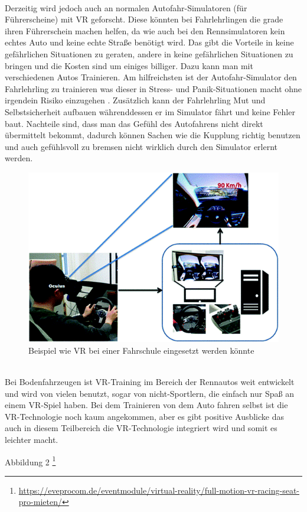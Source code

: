 \\
Derzeitig wird jedoch auch an normalen Autofahr-Simulatoren (für Führerscheine) mit VR geforscht. Diese könnten bei Fahrlehrlingen die grade ihren Führerschein machen helfen, da wie auch bei den Rennsimulatoren kein echtes Auto und keine echte Straße benötigt wird. Das gibt die Vorteile in keine gefährlichen Situationen zu geraten, andere in keine gefährlichen Situationen zu bringen und die Kosten sind um einiges billiger. Dazu kann man mit verschiedenen Autos Trainieren. Am hilfreichsten ist der Autofahr-Simulator den Fahrlehrling zu trainieren was dieser in Stress- und Panik-Situationen macht ohne irgendein Risiko einzugehen \cite{ihemedu2017virtual}. Zusätzlich kann der Fahrlehrling Mut und Selbstsicherheit aufbauen währenddessen er im Simulator fährt und keine Fehler baut. Nachteile sind, dass man das Gefühl des Autofahrens nicht direkt übermittelt bekommt, dadurch können Sachen wie die Kupplung richtig benutzen und auch gefühlsvoll zu bremsen nicht wirklich durch den Simulator erlernt werden.
\\
\begin{figure}[!ht]
    \centering
    \includegraphics[width=1.0\textwidth]{images/Abbildung 3.png}
    \caption{\label{fig:Abbildung 3}Beispiel wie VR bei einer Fahrschule eingesetzt werden könnte\cite{ihemedu2017virtual}\protect
    }
\end{figure}
\\
Bei Bodenfahrzeugen ist VR-Training im Bereich der Rennautos weit entwickelt und wird von vielen benutzt, sogar von nicht-Sportlern, die einfach nur Spaß an einem VR-Spiel haben. Bei dem Trainieren von dem Auto fahren selbst ist die VR-Technologie noch kaum angekommen, aber es gibt positive Ausblicke das auch in diesem Teilbereich die VR-Technologie integriert wird und somit es leichter macht.

Abbildung 2 \footnote{\url{https://eveprocom.de/eventmodule/virtual-reality/full-motion-vr-racing-seat-pro-mieten/}}

